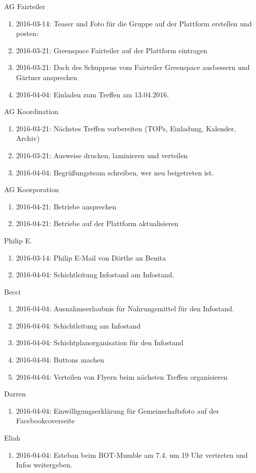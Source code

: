 \documentclass{scrreprt}
\begin{document}
AG Fairteiler
\begin{enumerate}
	\item 2016-03-14: Teaser und Foto für die Gruppe auf der Plattform erstellen und posten:
	\item 2016-03-21: Greenspace Fairteiler auf der Plattform eintragen
	\item 2016-03-21: Dach des Schuppens vom Fairteiler Greenspace ausbessern und Gärtner ansprechen
	\item 2016-04-04: Einladen zum Treffen am 13.04.2016.
\end{enumerate}
AG Koordination
\begin{enumerate}
	\item 2016-03-21: Nächstes Treffen vorbereiten (TOPs, Einladung, Kalender, Archiv)
	\item 2016-03-21: Ausweise drucken, laminieren und verteilen
	\item 2016-04-04: Begrüßungsteam schreiben, wer neu beigetreten ist.
\end{enumerate}
AG Koorporation
\begin{enumerate}
	\item 2016-04-21: Betriebe ansprechen
	\item 2016-04-21: Betriebe auf der Plattform aktualisieren
\end{enumerate}
Philip E.
\begin{enumerate}
    \item 2016-03-14: Philip E-Mail von Dörthe an Benita
    \item 2016-04-04: Schichtleitung Infostand am Infostand.
\end{enumerate}
Becci
\begin{enumerate}
    \item 2016-04-04: Ausnahmeerlaubnis für Nahrungsmittel für den Infostand.
    \item 2016-04-04: Schichtleitung am Infostand
    \item 2016-04-04: Schichtplanorganisation für den Infostand
    \item 2016-04-04: Buttons machen 
    \item 2016-04-04: Verteilen von Flyern beim nächsten Treffen organisieren
\end{enumerate}
Darren
\begin{enumerate}
	\item 2016-04-04: Einwilligungserklärung für Gemeinschaftsfoto auf der Facebookcoverseite
\end{enumerate} 
Eliah
\begin{enumerate}
    \item 2016-04-04: Esteban beim BOT-Mumble am 7.4. um 19 Uhr vertreten und Infos weitergeben.
\end{enumerate}    
\end{document}
